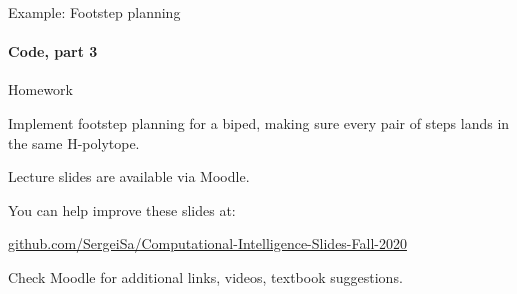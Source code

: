 \documentclass{beamer}
\begin{document}
\begin{frame}{Example: Footstep planning}
\framesubtitle{Code, part 3}
\begin{flushleft}


 
\end{flushleft}
\end{frame}




\begin{frame}{Homework}
\begin{flushleft}

Implement footstep planning for a biped, making sure every pair of steps lands in the same H-polytope.

\end{flushleft}
\end{frame}



\begin{frame}
\centerline{Lecture slides are available via Moodle.}
\bigskip
\centerline{You can help improve these slides at:}

\centerline{\href{https://github.com/SergeiSa/Computational-Intelligence-Slides-Fall-2020}{github.com/SergeiSa/Computational-Intelligence-Slides-Fall-2020}}


\bigskip
\centerline{Check Moodle for additional links, videos, textbook suggestions.}
\end{frame}
\end{document}
